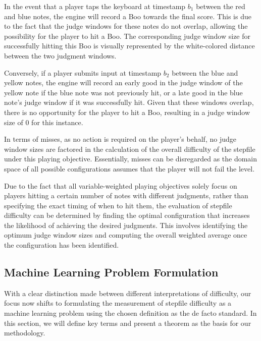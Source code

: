 In the event that a player taps the keyboard at timestamp $b_1$ between the red and blue notes, the engine will record a Boo towards the final score. This is due to the fact that the judge windows for these notes do not overlap, allowing the possibility for the player to hit a Boo. The corresponding judge window size for successfully hitting this Boo is visually represented by the white-colored distance between the two judgment windows.

\vspace{2mm}

Conversely, if a player submits input at timestamp $b_2$ between the blue and yellow notes, the engine will record an early good in the judge window of the yellow note if the blue note was not previously hit, or a late good in the blue note's judge window if it was successfully hit. Given that these windows overlap, there is no opportunity for the player to hit a Boo, resulting in a judge window size of $0$ for this instance.

\vspace{2mm}

In terms of misses, as no action is required on the player's behalf, no judge window sizes are factored in the calculation of the overall difficulty of the stepfile under this playing objective. Essentially, misses can be disregarded as the domain space of all possible configurations assumes that the player will not fail the level.

\vspace{2mm}

Due to the fact that all variable-weighted playing objectives solely focus on players hitting a certain number of notes with different judgments, rather than specifying the exact timing of when to hit them, the evaluation of stepfile difficulty can be determined by finding the optimal configuration that increases the likelihood of achieving the desired judgments. This involves identifying the optimum judge window sizes and computing the overall weighted average once the configuration has been identified.

\subsection{Machine Learning Problem Formulation}

With a clear distinction made between different interpretations of difficulty, our focus now shifts to formulating the measurement of stepfile difficulty as a machine learning problem using the chosen definition as the de facto standard. In this section, we will define key terms and present a theorem as the basis for our methodology.

